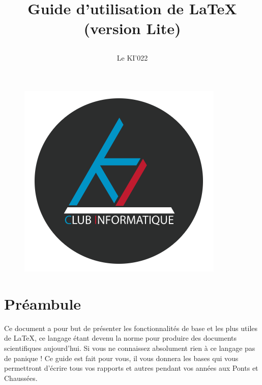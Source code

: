 \documentclass[11pt]{article}				%
\title{\textbf{Guide d'utilisation de \LaTeX} (version Lite)
\author{Le KI'022}
\date{}
}
\begin{document}
\maketitle

\begin{figure}[h]
\begin{center}
\includegraphics[scale=0.5]{ressources/KI.png}
\end{center}
\end{figure}

\section*{Préambule}

Ce document a pour but de présenter les fonctionnalités de base et les plus utiles de LaTeX, ce langage étant devenu la norme pour produire des documents scientifiques aujourd'hui. Si vous ne connaissez absolument rien à ce langage pas de panique ! Ce guide est fait pour vous, il vous donnera les bases qui vous permettront d'écrire tous vos rapports et autres pendant vos années aux Ponts et Chaussées. \\
\end{document}
